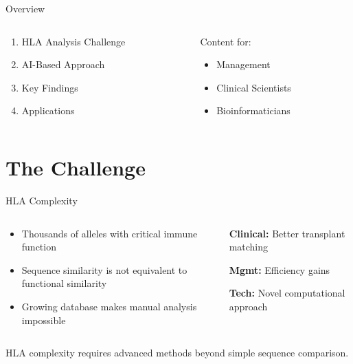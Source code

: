 \documentclass[aspectratio=169]{beamer}
\newcommand{\formanagement}[1]{\textcolor{managementcolor}{\textbf{Mgmt:} #1}}
\newcommand{\forclinical}[1]{\textcolor{clinicalcolor}{\textbf{Clinical:} #1}}
\newcommand{\forbioinformatics}[1]{\textcolor{bioinfocolor}{\textbf{Tech:} #1}}
\newcommand{\keytakeaway}[1]{\vspace{0.3cm}\begin{tcolorbox}[colback=yellow!10,colframe=yellow!50!black,title=Key Takeaway]\small #1\end{tcolorbox}}
\begin{document}
\begin{frame}{Overview}
  \begin{columns}
    \begin{column}{0.6\textwidth}
      \begin{enumerate}
        \item HLA Analysis Challenge
        \item AI-Based Approach
        \item Key Findings
        \item Applications
      \end{enumerate}
    \end{column}
    \begin{column}{0.4\textwidth}
      \begin{tcolorbox}[colback=gray!5,colframe=gray!40]
      Content for:
      \begin{itemize}\small
        \item \textcolor{managementcolor}{Management}
        \item \textcolor{clinicalcolor}{Clinical Scientists}
        \item \textcolor{bioinfocolor}{Bioinformaticians}
      \end{itemize}
      \end{tcolorbox}
    \end{column}
  \end{columns}
\end{frame}

\section{The Challenge}

\begin{frame}{HLA Complexity}
  \begin{columns}
    \begin{column}{0.6\textwidth}
      \begin{itemize}
        \item Thousands of alleles with critical immune function
        \item Sequence similarity is not equivalent to functional similarity
        \item Growing database makes manual analysis impossible
      \end{itemize}
    \end{column}
    \begin{column}{0.4\textwidth}
      \begin{tcolorbox}[colback=gray!5,colframe=gray!40]
      \forclinical{Better transplant matching}
      
      \formanagement{Efficiency gains}
      
      \forbioinformatics{Novel computational approach}
      \end{tcolorbox}
    \end{column}
  \end{columns}
  
  \keytakeaway{HLA complexity requires advanced methods beyond simple sequence comparison.}
\end{frame}
\end{document}
